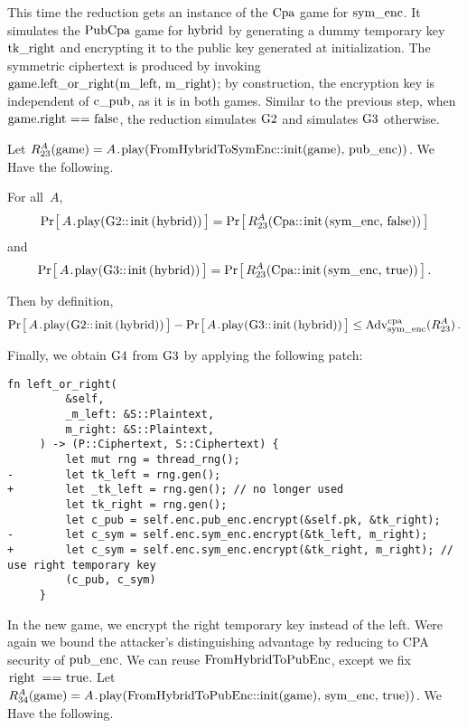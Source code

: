 %
This time the reduction gets an instance of the
\hyperref[fig/symenc/security]{$\code{Cpa}$} game for $\code{sym_enc}$. It
simulates the $\code{PubCpa}$ game for $\code{hybrid}$ by generating a dummy
temporary key $\code{tk_right}$ and encrypting it to the public key generated at
initialization. The symmetric ciphertext is produced by invoking
$\code{game.left_or_right(m_left, m_right)}$; by construction, the encryption
key is independent of $\code{c_pub}$, as it is in both games.
%
Similar to the previous step, when $\code{game.right == false}$, the reduction
simulates $\code{G2}$ and simulates $\code{G3}$ otherwise.

Let $R_{\code{23}}^A(\code{game}) =
A\code{.play(FromHybridToSymEnc::init(game), pub_enc))}$.
%
We Have the following.

\begin{claim}
  For all~$A$,
  \[
    \Prob{A\code{.play(G2::init(hybrid))}} =
    \Prob{R_{\code{23}}^A(\code{Cpa::init(sym_enc, false)})}
  \]
  and
  \[
    \Prob{A\code{.play(G3::init(hybrid))}} =
    \Prob{R_{\code{23}}^A(\code{Cpa::init(sym_enc, true)})} \,.
  \]
\end{claim}
%
%
Then by definition,
%
\[
  \Prob{A\code{.play(G2::init(hybrid))}} -
  \Prob{A\code{.play(G3::init(hybrid))}} \leq
  \Adv{cpa}_\code{sym_enc}(R_{\code{23}}^A) \,.
\]

Finally, we obtain $\code{G4}$ from $\code{G3}$ by applying the following patch:
%
\begin{lstlisting}[style=patch]
    fn left_or_right(
         &self,
         _m_left: &S::Plaintext,
         m_right: &S::Plaintext,
     ) -> (P::Ciphertext, S::Ciphertext) {
         let mut rng = thread_rng();
-        let tk_left = rng.gen();
+        let _tk_left = rng.gen(); // no longer used
         let tk_right = rng.gen();
         let c_pub = self.enc.pub_enc.encrypt(&self.pk, &tk_right);
-        let c_sym = self.enc.sym_enc.encrypt(&tk_left, m_right);
+        let c_sym = self.enc.sym_enc.encrypt(&tk_right, m_right); // use right temporary key
         (c_pub, c_sym)
     }
\end{lstlisting}
%
In the new game, we encrypt the right temporary key instead of the left. Were
again we bound the attacker's distinguishing advantage by reducing to CPA
security of $\code{pub_enc}$.
%
We can reuse $\code{FromHybridToPubEnc}$, except we fix $\code{right == true}$.
%
Let $R_{\code{34}}^A(\code{game}) =
A\code{.play(FromHybridToPubEnc::init(game), sym_enc, true))}$.
%
We Have the following.

